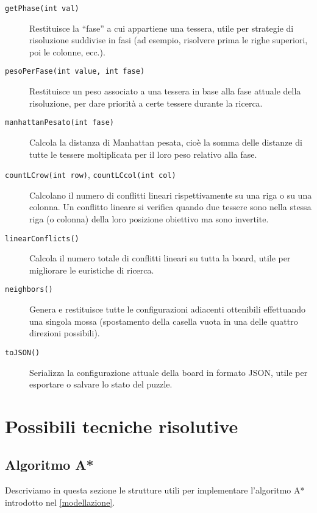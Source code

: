 \begin{description}
    \item[\texttt{getPhase(int val)}] 
        Restituisce la “fase” a cui appartiene una tessera, utile per strategie di risoluzione suddivise in fasi (ad esempio, risolvere prima le righe superiori, poi le colonne, ecc.).
        
    \item[\texttt{pesoPerFase(int value, int fase)}] 
        Restituisce un peso associato a una tessera in base alla fase attuale della risoluzione, per dare priorità a certe tessere durante la ricerca.
        
    \item[\texttt{manhattanPesato(int fase)}] 
        Calcola la distanza di Manhattan pesata, cioè la somma delle distanze di tutte le tessere moltiplicata per il loro peso relativo alla fase.
        
    \item[\texttt{countLCrow(int row)}, \texttt{countLCcol(int col)}] 
        Calcolano il numero di conflitti lineari rispettivamente su una riga o su una colonna. Un conflitto lineare si verifica quando due tessere sono nella stessa riga (o colonna) della loro posizione obiettivo ma sono invertite.
        
    \item[\texttt{linearConflicts()}] 
        Calcola il numero totale di conflitti lineari su tutta la board, utile per migliorare le euristiche di ricerca.
        
    \item[\texttt{neighbors()}] 
        Genera e restituisce tutte le configurazioni adiacenti ottenibili effettuando una singola mossa (spostamento della casella vuota in una delle quattro direzioni possibili).
        
    \item[\texttt{toJSON()}] 
        Serializza la configurazione attuale della board in formato JSON, utile per esportare o salvare lo stato del puzzle.
\end{description}

\section{Possibili tecniche risolutive}
\subsection{Algoritmo A*}
Descriviamo in questa sezione le strutture utili per implementare l'algoritmo A* introdotto nel \cref{modellazione}. 

